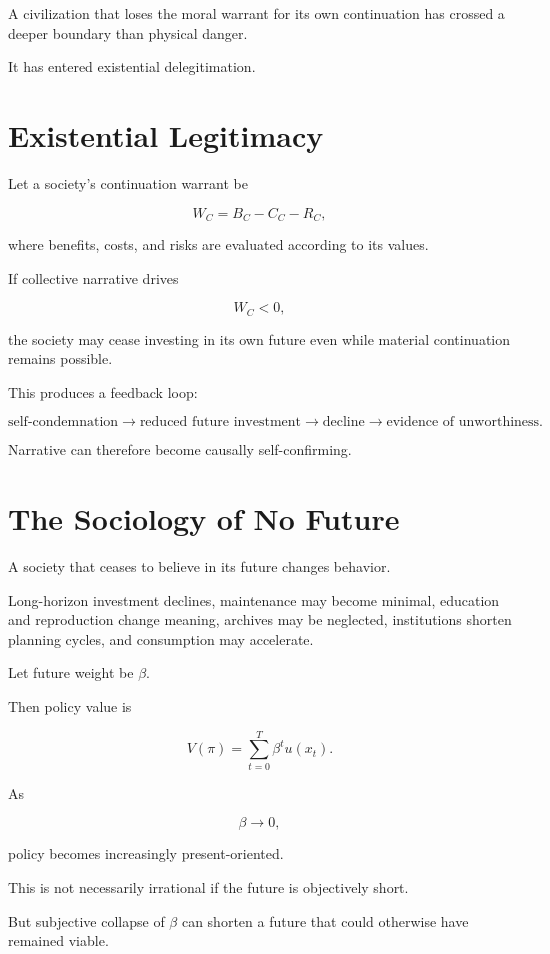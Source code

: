 \documentclass[11pt,oneside]{book}
\theoremstyle{definition}
\theoremstyle{remark}
\begin{document}
A civilization that loses the moral warrant for its own continuation has crossed a deeper boundary than physical danger.

It has entered existential delegitimation.

\section{Existential Legitimacy}

Let a society's continuation warrant be

\[
W_C
=
B_C-C_C-R_C,
\]

where benefits, costs, and risks are evaluated according to its values.

If collective narrative drives

\[
W_C<0,
\]

the society may cease investing in its own future even while material continuation remains possible.

This produces a feedback loop:

\[
\text{self-condemnation}
\rightarrow
\text{reduced future investment}
\rightarrow
\text{decline}
\rightarrow
\text{evidence of unworthiness}.
\]

Narrative can therefore become causally self-confirming.

\section{The Sociology of No Future}

A society that ceases to believe in its future changes behavior.

Long-horizon investment declines, maintenance may become minimal, education and reproduction change meaning, archives may be neglected, institutions shorten planning cycles, and consumption may accelerate.

Let future weight be \(\beta\).

Then policy value is

\[
V(\pi)
=
\sum_{t=0}^{T}
\beta^t u(x_t).
\]

As

\[
\beta\rightarrow0,
\]

policy becomes increasingly present-oriented.

This is not necessarily irrational if the future is objectively short.

But subjective collapse of \(\beta\) can shorten a future that could otherwise have remained viable.
\end{document}
